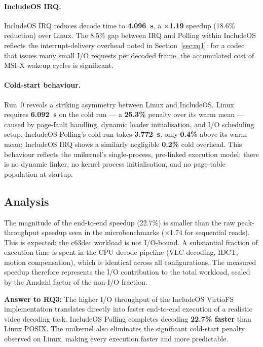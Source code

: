\documentclass[12pt, a4paper, oneside]{report}
\begin{document}
\paragraph{IncludeOS IRQ.}
IncludeOS IRQ reduces decode time to \textbf{4.096~s}, a $\times$\textbf{1.19}
speedup (18.6\% reduction) over Linux.  The 8.5\% gap between IRQ and Polling
within IncludeOS reflects the interrupt-delivery overhead noted in
Section~\ref{sec:rq1}: for a codec that issues many small I/O requests per
decoded frame, the accumulated cost of MSI-X wakeup cycles is significant.

\paragraph{Cold-start behaviour.}
Run~0 reveals a striking asymmetry between Linux and IncludeOS.  Linux requires
\textbf{6.092~s} on the cold run --- a \textbf{25.3\%} penalty over its warm
mean --- caused by page-fault handling, dynamic loader initialisation, and I/O
scheduling setup.  IncludeOS Polling's cold run takes \textbf{3.772~s}, only
\textbf{0.4\%} above its warm mean; IncludeOS IRQ shows a similarly negligible
\textbf{0.2\%} cold overhead.  This behaviour reflects the unikernel's
single-process, pre-linked execution model: there is no dynamic linker, no kernel
process initialisation, and no page-table population at startup.

\subsection{Analysis}

The magnitude of the end-to-end speedup (22.7\%) is smaller than the raw
peak-throughput speedup seen in the microbenchmarks ($\times$1.74 for sequential
reads).  This is expected: the c63dec workload is not I/O-bound.  A substantial
fraction of execution time is spent in the CPU decode pipeline (VLC decoding,
IDCT, motion compensation), which is identical across all configurations.  The
measured speedup therefore represents the I/O contribution to the total workload,
scaled by the Amdahl factor of the non-I/O fraction.

\textbf{Answer to RQ3:}  The higher I/O throughput of the IncludeOS VirtioFS
implementation translates directly into faster end-to-end execution of a
realistic video decoding task.  IncludeOS Polling completes decoding
\textbf{22.7\% faster} than Linux POSIX. The unikernel also eliminates the significant cold-start
penalty observed on Linux, making every execution faster and more predictable.
\end{document}
